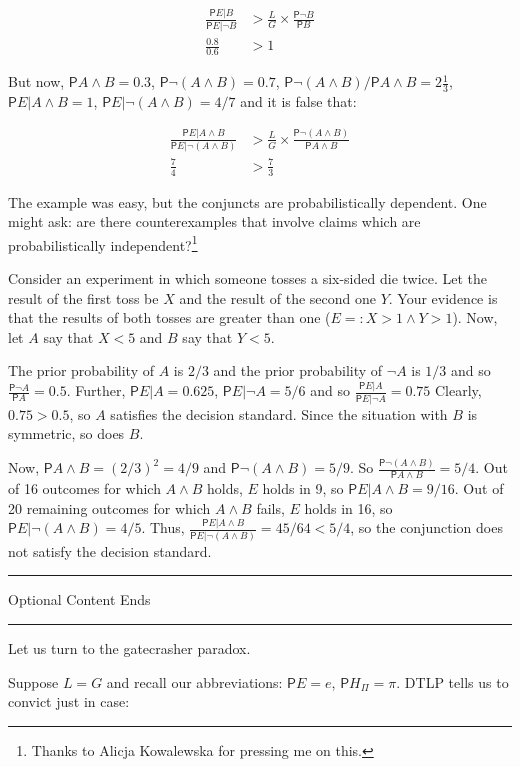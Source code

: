 \documentclass[10pt,dvipsnames,enabledeprecatedfontcommands]{scrartcl}
\newcommand{\n}{\neg}
\newcommand{\et}{\wedge}
\newcommand{\pr}{\mathsf{P}}
\newcommand{\intermezzob}{\nopagebreak 
	\begin{minipage}[c]{13cm}
	\begin{center}\rule{10cm}{0.4pt}

	\tiny{\sc Optional Content Ends}
	
	\vspace{-1mm}
	
	\rule{10cm}{0.4pt}\end{center}
	\end{minipage}
	}
\begin{document}
\begin{align*}
 \frac{\pr{E\vert B}}{\pr{E\vert \n B}}&> \frac{L}{G}\times \frac{\pr{\n B}}{\pr{B}}\\
 \frac{0.8}{0.6} & > 1 
 \end{align*}

But now, \(\pr{A\et B}=0.3\), \(\pr{\n (A \et B)}=0.7\),
\(\pr{\n (A\et B)}/\pr{A\et B}=2\frac{1}{3}\),
\(\pr{E\vert A \et B}=1\), \(\pr{E\vert \n (A\et B)}=4/7\) and it is
false that:

\begin{align*}
 \frac{\pr{E\vert A \et B}}{\pr{E\vert \n (A\et B)}}&> \frac{L}{G}\times \frac{\pr{\n (A \et B)}}{\pr{A \et B}}\\
 \frac{7}{4} & > \frac{7}{3} 
 \end{align*}

The example was easy, but the conjuncts are probabilistically dependent.
One might ask: are there counterexamples that involve claims which are
probabilistically
independent?\footnote{Thanks to Alicja Kowalewska for pressing me on this.}

Consider an experiment in which someone tosses a six-sided die twice.
Let the result of the first toss be \(X\) and the result of the second
one \(Y\). Your evidence is that the results of both tosses are greater
than one (\(E=: X>1 \et Y>1\)). Now, let \(A\) say that \(X<5\) and
\(B\) say that \(Y<5\).

The prior probability of \(A\) is \(2/3\) and the prior probability of
\(\n A\) is \(1/3\) and so \(\frac{\pr{\n A}}{\pr{A}}=0.5\). Further,
\(\pr{E\vert A}=0.625\), \(\pr{E\vert \n A}= 5/6\) and so
\(\frac{\pr{E\vert A}}{\pr{E\vert \n A}}=0.75\) Clearly, \(0.75>0.5\),
so \(A\) satisfies the decision standard. Since the situation with \(B\)
is symmetric, so does \(B\).

Now, \(\pr{A\et B}=(2/3)^2=4/9\) and \(\pr{\n (A\et B)}=5/9\). So
\(\frac{\pr{\n(A\et B)}}{\pr{A\et B}}=5/4\). Out of 16 outcomes for
which \(A\et B\) holds, \(E\) holds in 9, so
\(\pr{E\vert A\et B}=9/16\). Out of 20 remaining outcomes for which
\(A\et B\) fails, \(E\) holds in 16, so \(\pr{E\vert \n (A\et B)}=4/5\).
Thus, \(\frac{\pr{E\vert A\et B}}{\pr{E\vert \n (A\et B)}}=45/64 <5/4\),
so the conjunction does not satisfy the decision standard.

\intermezzob

Let us turn to the gatecrasher paradox.

Suppose \(L=G\) and recall our abbreviations: \(\pr{E}=e\),
\(\pr{H_\Pi}=\pi\). DTLP tells us to convict just in case:
\end{document}
